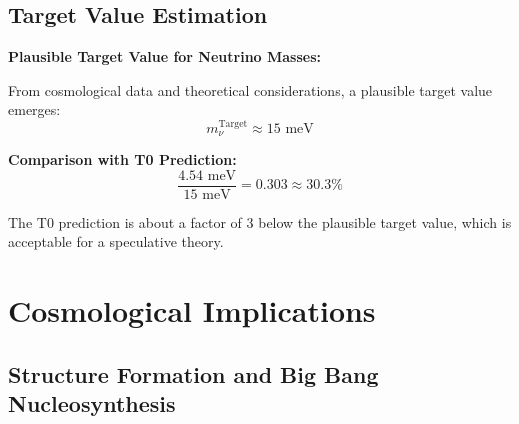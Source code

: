 \documentclass[12pt,a4paper]{article}
\begin{document}
	\subsection{Target Value Estimation}
	
	\begin{keyresult}
		\textbf{Plausible Target Value for Neutrino Masses:}
		
		From cosmological data and theoretical considerations, a plausible target value emerges:
		\begin{equation}
			m_\nu^{\text{Target}} \approx 15 \text{ meV}
		\end{equation}
		
		\textbf{Comparison with T0 Prediction:}
		\begin{equation}
			\frac{4.54 \text{ meV}}{15 \text{ meV}} = 0.303 \approx 30.3\%
		\end{equation}
		
		The T0 prediction is about a factor of 3 below the plausible target value, which is acceptable for a speculative theory.
	\end{keyresult}
	
	\section{Cosmological Implications}
	
	\subsection{Structure Formation and Big Bang Nucleosynthesis}
	
\end{document}
